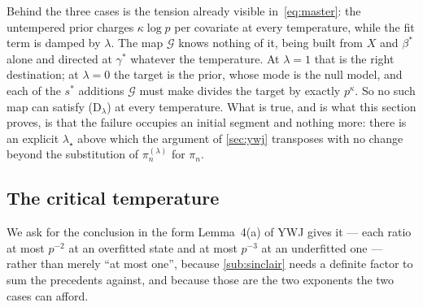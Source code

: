 \documentclass[aos]{imsart}
\theoremstyle{plain}
\theoremstyle{definition}
\begin{document}
    Behind the three cases is the tension already visible
    in~\eqref{eq:master}: the untempered prior charges $\kappa\log p$ per
    covariate at every temperature, while the fit term is damped by
    $\lambda$. The map $\mathcal{G}$ knows nothing of it, being built from
    $X$ and $\beta^{\ast}$ alone and directed at $\gamma^{\ast}$ whatever
    the temperature. At $\lambda=1$ that is the right destination; at
    $\lambda=0$ the target is the prior, whose mode is the null model, and
    each of the $s^{\ast}$ additions $\mathcal{G}$ must make divides the
    target by exactly $p^{\kappa}$. So no such map can satisfy
    (D$_\lambda$) at every temperature. What is true, and is what this
    section proves, is that the failure occupies an initial segment and
    nothing more: there is an explicit $\lambda_\star$ above which the
    argument of \cref{sec:ywj} transposes with no change beyond the
    substitution of $\pi_n^{(\lambda)}$ for $\pi_n$.

    \subsection{The critical temperature}
    \label{sub:critical}

    We ask for the conclusion in the form Lemma~4(a) of YWJ gives it --- each
    ratio at most $p^{-2}$ at an overfitted state and at most $p^{-3}$ at an
    underfitted one --- rather than merely ``at most one'', because
    \cref{sub:sinclair} needs a definite factor to sum the precedents
    against, and because those are the two exponents the two cases can
    afford.
\end{document}
